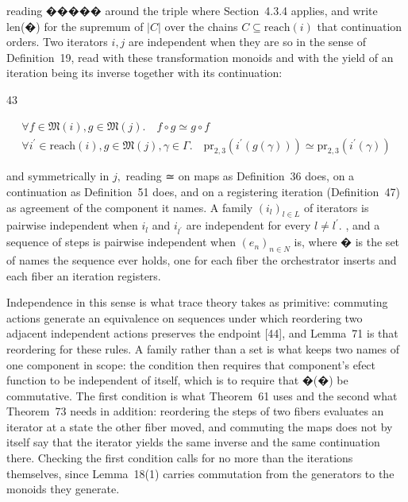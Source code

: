 \documentclass[
  10
]{article}
\begin{document}
reading ����� around the triple where Section~4.3.4 applies, and write
len(�) for the supremum of \(| C |\) over the chains
\(C \subseteq \mathrm { r e a c h } ( i )\) that continuation orders.
Two iterators \(i , j\) are independent when they are so in the sense of
Definition~19, read with these transformation monoids and with the yield
of an iteration being its inverse together with its continuation:

43

\[
\begin{array} { r } { \forall f \in \mathfrak { M } ( i ) , g \in \mathfrak { M } ( j ) . \quad f \circ g \simeq g \circ f \qquad } \\ { \forall i ^ { \prime } \in \mathrm { r e a c h } ( i ) , g \in \mathfrak { M } ( j ) , \gamma \in \Gamma . \quad \mathrm { p r } _ { 2 , 3 } ( i ^ { \prime } ( g ( \gamma ) ) ) \simeq \mathrm { p r } _ { 2 , 3 } ( i ^ { \prime } ( \gamma ) ) } \end{array}\tag{55}
\]

and symmetrically in \(j ,\) reading ≃ on maps as Definition~36 does, on
a continuation as Definition~51 does, and on a registering iteration
(Definition~47) as agreement of the component it names. A family
\(\left( i _ { l } \right) _ { l \in L }\) of iterators is pairwise
independent when \(i _ { l }\) and \(i _ { l ^ { \prime } }\) are
independent for every
\({ \mathit { l } } \neq { \mathit { l } } ^ { \prime } .\) , and a
sequence of steps is pairwise independent when
\(\left( e _ { n } \right) _ { n \in N }\) is, where � is the set of
names the sequence ever holds, one for each fiber the orchestrator
inserts and each fiber an iteration registers.

Independence in this sense is what trace theory takes as primitive:
commuting actions generate an equivalence on sequences under which
reordering two adjacent independent actions preserves the endpoint
{[}44{]}, and Lemma~71 is that reordering for these rules. A family
rather than a set is what keeps two names of one component in scope: the
condition then requires that component's efect function to be
independent of itself, which is to require that �(�) be commutative. The
first condition is what Theorem~61 uses and the second what Theorem~73
needs in addition: reordering the steps of two fibers evaluates an
iterator at a state the other fiber moved, and commuting the maps does
not by itself say that the iterator yields the same inverse and the same
continuation there. Checking the first condition calls for no more than
the iterations themselves, since Lemma~18(1) carries commutation from
the generators to the monoids they generate.
\end{document}
